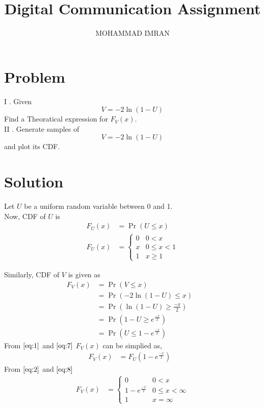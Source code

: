 \documentclass[journal,12pt,twocolumn]{article}
\title{\mytitle}
\title{
Digital Communication Assignment
}
\author{MOHAMMAD IMRAN}
\providecommand{\pr}[1]{\ensuremath{\Pr\left(#1\right)}}
\providecommand{\brak}[1]{\ensuremath{\left(#1\right)}}
\begin{document}
\maketitle
\bigskip


\section{\textbf{Problem }}
I . Given
\begin{equation}
V = -2\ln\brak{1-U}  \nonumber
\end{equation}
Find a Theoratical expression for  $F_V (x)$.
\\

II . Generate samples of 
\begin{equation}
V = -2\ln\brak{1-U}  \nonumber
\end{equation}
and plot its CDF.
\section{\textbf{Solution }}

Let $U$ be a uniform random variable between 0 and 1.
\\
Now, CDF of $U$ is 
\begin{align}
F_{U}(x) &= \pr{U \le x}   \label{eq:1}
\\
F_{U}(x)  &= 
\begin{cases}
0 & 0 < x 
\\
x & 0 \le x < 1
\\ 
1 &  x \ge 1                \label{eq:2}
\end{cases}
\end{align}

Similarly, CDF of $V$ is given as
\begin{align}
F_{V}(x) &= \pr{V \le x}&
\\
&= \pr{-2\ln\brak{1-U} \le x}&
\\
&= \pr{\ln\brak{1-U} \ge \frac{-x}{2}}&
\\
&= \pr{1-U \ge e^{\frac{-x}{2}}}&
\\
&= \pr{U \le 1-e^{\frac{-x}{2}}}&  \label{eq:7}
\end{align}
From $\eqref{eq:1}$ and $\eqref{eq:7}$ $F_V (x)$ can be simplied as,
\begin{align}
F_{V}(x) &= F_{U}(1-e^{\frac{-x}{2}})&    \label{eq:8}
\end{align}
From $\eqref{eq:2}$ and $\eqref{eq:8}$
\begin{align}
F_{V}(x)  &= 
\begin{cases}
0 & 0 < x 
\\
1-e^{\frac{-x}{2}} & 0 \le x < \infty
\\ 
1 &  x = \infty                
\end{cases}
\end{align}
\end{document}
